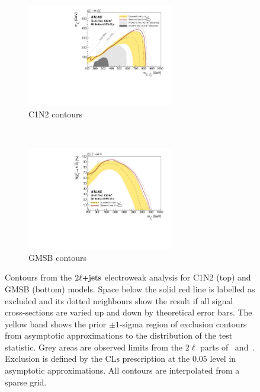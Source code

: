 \begin{figure}[tp]
\centering
\begin{subfigure}{\textwidth}
    \centering
    \includegraphics[width=0.7\textwidth]{figures/2ljets_contours_c1n2.pdf}
    \caption{C1N2 contours}
\end{subfigure}
\\[1em]
\begin{subfigure}{\textwidth}
    \centering
    \includegraphics[width=0.7\textwidth]{figures/2ljets_contours_gmsb.pdf}
    \caption{GMSB contours}
\end{subfigure}
\caption{%
Contours from the $2\ell\mathrm{+jets}$ electroweak analysis for
C1N2 (top) and GMSB (bottom) models.
Space below the solid red line is labelled as excluded and its dotted
neighbours show the result if all signal cross-sections are varied up and down
by theoretical error bars.
The yellow band shows the prior $\pm1$-sigma region of exclusion contours
from asymptotic approximations to the distribution of the test statistic.
Grey areas are observed limits from the $2\ell$ parts
of~\cite{SUSY-2016-24} and~\cite{SUSY-2013-11}.
Exclusion is defined by the $\mathrm{CLs}$ prescription at the $0.05$ level
in asymptotic approximations.
All contours are interpolated from a sparse grid.
}
\label{fig:2ljets_contours}
\end{figure}
